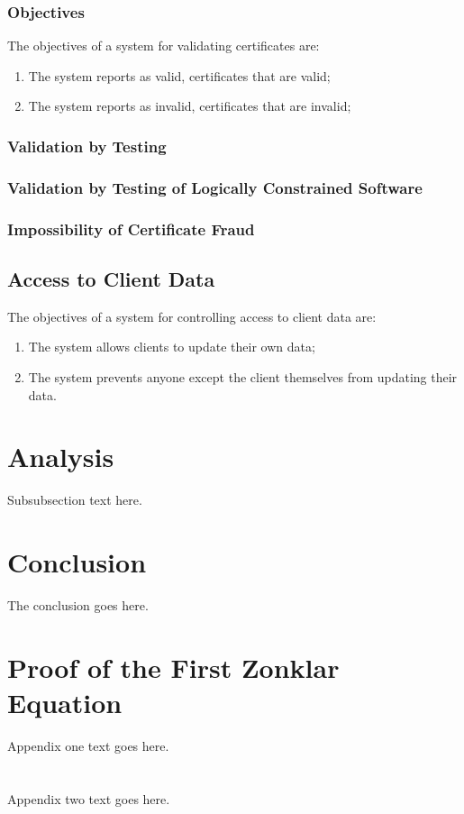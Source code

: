 \documentclass[journal]{IEEEtran}
\begin{document}
\subsubsection{Objectives}
The objectives of a system for validating certificates are:
\begin{enumerate}[CO-1]
\item The system reports as valid, certificates that are valid;
\item The system reports as invalid, certificates that are invalid;
\end{enumerate}

\subsubsection{Validation by Testing}

\subsubsection{Validation by Testing of Logically Constrained Software}

\subsubsection{Impossibility of Certificate Fraud}

\subsection{Access to Client Data}
The objectives of a system for controlling access to client data are:
\begin{enumerate}[DO-1]
\item The system allows clients to update their own data;
\item The system prevents anyone except the client themselves from updating their data.
\end{enumerate}

\section{Analysis}
Subsubsection text here.


\section{Conclusion}
The conclusion goes here.

\appendices
\section{Proof of the First Zonklar Equation}
Appendix one text goes here.

\section{}
Appendix two text goes here.




\end{document}
